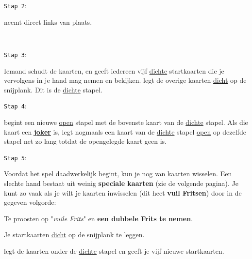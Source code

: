\noindent
\begin{minipage}[t]{.09\textwidth}
\texttt{Stap 2}:
\end{minipage}
\hfill
\begin{minipage}[t]{.91\textwidth}
\Willem neemt direct links van \Frits plaats. 
\end{minipage}
\\

\noindent
\begin{minipage}[t]{.09\textwidth}
\texttt{Stap 3}:
\end{minipage}
\hfill
\begin{minipage}[t]{.91\textwidth}
Iemand schudt de kaarten, en \Frits geeft iedereen vijf \ul{dichte} startkaarten die je vervolgens in je hand mag nemen en bekijken. \Frits legt de overige kaarten \ul{dicht} op de snijplank. Dit is de \ul{dichte} stapel. \\
\end{minipage}

\noindent
\begin{minipage}[t]{.09\textwidth}
\texttt{Stap 4}:
\end{minipage}
\hfill
\begin{minipage}[t]{.91\textwidth}
\Frits begint een nieuwe \ul{open} stapel met de bovenste kaart van de \ul{dichte} stapel. Als die kaart een \textbf{\ul{joker}} is, legt \Frits nogmaals een kaart van de \ul{dichte} stapel \ul{open} op dezelfde stapel net zo lang totdat de opengelegde kaart geen  is.
\end{minipage}

\vspace*{+0.35cm} 

\noindent
\begin{minipage}[t]{.09\textwidth}
\texttt{Stap 5}:
\end{minipage}
\hfill
\begin{minipage}[t]{.91\textwidth}
Voordat het spel daadwerkelijk begint, kun je nog van kaarten wisselen. Een slechte hand bestaat uit weinig \textbf{speciale kaarten} (zie de volgende pagina). Je kunt zo vaak als je wilt je kaarten inwisselen (dit heet \textbf{vuil Fritsen}) door in de gegeven volgorde:
\numeriekeLijst{}
    \item Te proosten op "\textit{vuile Frits}" en \textbf{een dubbele Frits te nemen}.
    \item Je startkaarten \ul{dicht} op de snijplank te leggen.
    \item \Frits legt de kaarten onder de \ul{dichte} stapel en geeft je vijf nieuwe startkaarten.
\eindNumeriekeLijst{}
\end{minipage}
\vspace*{+0.3cm} 
    
